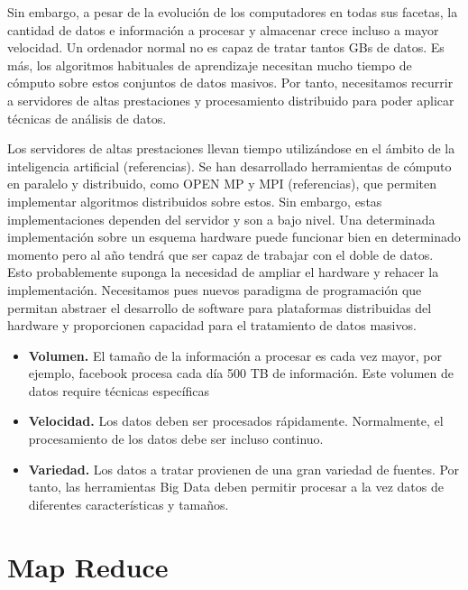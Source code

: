 \documentclass{article}
\begin{document}
	Sin embargo, a pesar de la evolución de los computadores en todas sus facetas, la cantidad de datos e información a procesar y almacenar crece incluso a mayor velocidad. Un ordenador normal no es capaz de tratar tantos GBs de datos. Es más, los algoritmos habituales de aprendizaje necesitan mucho tiempo de cómputo sobre estos conjuntos de datos masivos. Por tanto, necesitamos recurrir a servidores de altas prestaciones y procesamiento distribuido para poder aplicar técnicas de análisis de datos.
	
	Los servidores de altas prestaciones llevan tiempo utilizándose en el ámbito de la inteligencia artificial (referencias). Se han desarrollado herramientas de cómputo en paralelo y distribuido, como OPEN MP y MPI (referencias), que permiten implementar algoritmos distribuidos sobre estos. Sin embargo, estas implementaciones dependen del servidor y son a bajo nivel. Una determinada implementación sobre un esquema hardware puede funcionar bien en determinado momento pero al año tendrá que ser capaz de trabajar con el doble de datos. Esto probablemente suponga la necesidad de ampliar el hardware y rehacer la implementación. Necesitamos pues nuevos paradigma de programación que permitan abstraer el desarrollo de software para plataformas distribuidas del hardware y proporcionen capacidad para el tratamiento de datos masivos.
	
	


	\begin{itemize}
		\item \textbf{Volumen.} El tamaño de la información a procesar es cada vez mayor, por ejemplo, facebook procesa cada día 500 TB de información. Este volumen de datos require técnicas específicas 
		\item \textbf{Velocidad.} Los datos deben ser procesados rápidamente. Normalmente, el procesamiento de los datos debe ser incluso continuo.
		\item \textbf{Variedad.} Los datos a tratar provienen de una gran variedad de fuentes. Por tanto, las herramientas Big Data deben permitir procesar a la vez datos de diferentes características y tamaños.
	\end{itemize}


\section{Map Reduce}
\end{document}
